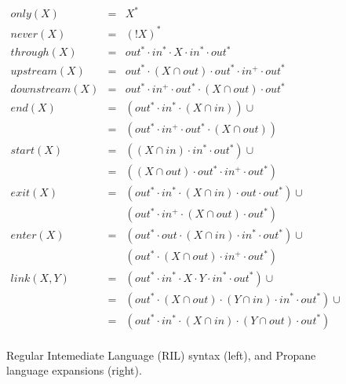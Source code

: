 \begin{figure*}
\begin{minipage}[t]{.42\linewidth}
  \end{minipage}
  ~~
  \vrule
  ~~
  \begin{minipage}[t]{.5\linewidth}
  \vspace*{-1\baselineskip}
  \[ \begin{array}{rcl}
    \hline
    only(X)       & = & X^* \\
    never(X)      & = & (!X)^* \\
    through(X)    & = & out^* \cdot in^* \cdot X \cdot in^* \cdot out^* \\
    upstream(X)   & = & out^* \cdot (X \cap out) \cdot out^* \cdot in^+ \cdot out^* \\
    downstream(X) & = & out^* \cdot in^+ \cdot out^* \cdot (X \cap out) \cdot out^* \\
    end(X)        & = & (out^* \cdot in^* \cdot (X \cap in)) \cup \\
                  & = & (out^* \cdot in^+ \cdot out^* \cdot (X \cap out)) \\
    start(X)      & = & ((X \cap in) \cdot in^* \cdot out^*) \cup \\
                  & = & ((X \cap out) \cdot out^* \cdot in^+ \cdot out^*) \\
    exit(X)       & = & (out^* \cdot in^* \cdot (X \cap in) \cdot out \cdot out^*) \cup \\
                  &        & (out^* \cdot in^+ \cdot (X \cap out) \cdot out^*) \\
    enter(X)      & = & (out^* \cdot out \cdot (X \cap in) \cdot in^* \cdot out^*) \cup \\
                  &        & (out^* \cdot (X \cap out) \cdot in^+ \cdot out^*) \\
    link(X,Y)     & = & (out^* \cdot in^* \cdot X \cdot Y \cdot in^* \cdot out^*) \cup \\
                  & = & (out^* \cdot (X \cap out) \cdot (Y \cap in) \cdot in^* \cdot out^*) \cup \\
                  & = & (out^* \cdot in^* \cdot (X \cap in) \cdot (Y \cap out) \cdot out^*) \\
  \end{array} \]

  \end{minipage}

  \hrulefill

  \caption{Regular Intemediate Language (RIL) syntax (left), and 
           Propane language expansions (right).}
  \label{fig:semantics}
\end{figure*}


